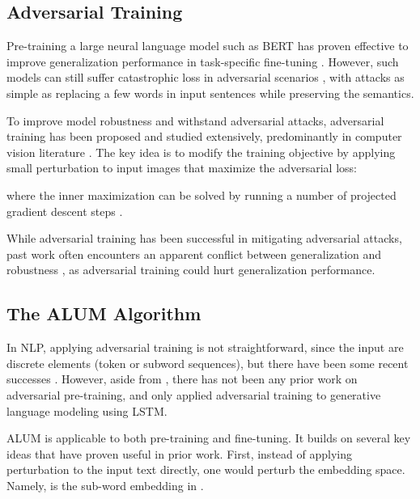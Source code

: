 \documentclass[11pt,a4paper]{article}
\newcommand\DNAME{ALUM}
\begin{document}
\subsection{Adversarial Training}
\label{subsec:at}
Pre-training a large neural language model such as BERT has proven effective to improve generalization performance in task-specific fine-tuning \cite{devlin2018bert}. However, such models can still suffer catastrophic loss in adversarial scenarios \cite{nie2019adversarial,hsieh2019robust-self-att,madry2017pgd,jin2019bertrobust}, with attacks as simple as replacing a few words in input sentences while preserving the semantics.

To improve model robustness and withstand adversarial attacks, adversarial training has been proposed and studied extensively, predominantly in computer vision literature \cite{goodfellow2014explaining,madry2017pgd}.
The key idea is to modify the training objective by applying small perturbation to input images that maximize the adversarial loss:

where the inner maximization can be solved by running a number of projected gradient descent steps \cite{madry2017pgd}. 

While adversarial training has been successful in mitigating adversarial attacks, past work often encounters an apparent conflict between generalization and robustness \cite{raghunathan2019adv-hurt,raghunathan2020understanding,min2020curious}, as adversarial training could hurt generalization performance. 

\subsection{The {\DNAME} Algorithm}

In NLP, applying adversarial training is not straightforward, since the input are discrete elements (token or subword sequences), but there have been some recent successes  \cite{zhu2019freelb,jiang2019smart,cheng-etal-2019-adv-nmt,wang2019adv-lm,minaee2020deep}. 
However, aside from , there has not been any prior work on adversarial pre-training, and  only applied adversarial training to generative language modeling using LSTM.

{\DNAME} is applicable to both pre-training and fine-tuning.
It builds on several key ideas that have proven useful in prior work.
First, instead of applying perturbation to the input text directly, one would perturb the embedding space. Namely,  is the sub-word embedding in  \cite{jiang2019smart, zhu2019freelb}.
\end{document}

